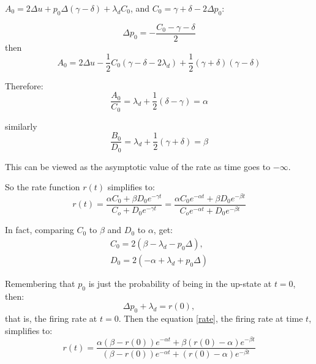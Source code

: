 $A_0 = 2\Delta u + p_0\Delta(\gamma-\delta) + \lambda_d C_0$, and $C_0 = \gamma + \delta -2\Delta p_0$:

\begin{equation}
\Delta p_0 = -\frac{C_0 - \gamma - \delta}{2}
\end{equation}
then
\begin{equation}
A_0 = 2\Delta u - \frac{1}{2}C_0(\gamma-\delta - 2\lambda_d) +\frac{1}{2}(\gamma+\delta)(\gamma-\delta)
\end{equation}

Therefore:
\begin{equation}
\frac{A_0}{C_0} = \lambda_d + \frac{1}{2}(\delta-\gamma) = \alpha
\end{equation}

similarly
\begin{equation}
\frac{B_0}{D_0} = \lambda_d + \frac{1}{2}(\gamma+\delta) = \beta
\end{equation}

This can be viewed as the asymptotic value of the rate as time goes to $-\infty$.

So the rate function $r(t)$ simplifies to:
\begin{equation}\label{rate}
r(t) = \frac{\alpha C_0 + \beta D_0e^{-\gamma t}}{C_o + D_0e^{-\gamma t}} = \frac{\alpha C_0e^{-\alpha t} + \beta D_0e^{-\beta t}}{C_oe^{-\alpha t} + D_0e^{-\beta t}} 
\end{equation}

In fact, comparing $C_0$ to $\beta$ and $D_0$ to $\alpha$, get:
\begin{equation}
\begin{split}
C_0 = 2(\beta - \lambda_d - p_0\Delta), \\ 
D_0 = 2(-\alpha + \lambda_d + p_0\Delta)
\end{split}
\end{equation}

Remembering that $p_0$ is just the probability of being in the up-state at $t=0$, then:
\begin{equation}
\Delta p_0 + \lambda_d = r(0),
\end{equation}
that is, the firing rate at $t=0$.  Then the equation \ref{rate}, the firing rate at time $t$, simplifies to:
\begin{equation}
r(t) = \frac{\alpha(\beta - r(0))e^{-\alpha t} + \beta(r(0)-\alpha)e^{-\beta t}}{(\beta - r(0))e^{-\alpha t} + (r(0)-\alpha)e^{-\beta t}}
\end{equation}

